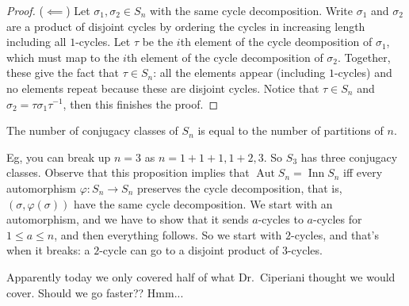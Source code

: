 \begin{example}
\begin{proof}
       ($\impliedby $) Let $\sigma_1,\sigma_2\in S_n$ with the same cycle decomposition. Write $\sigma_1$ and $\sigma_2$ are a product of disjoint cycles by ordering the cycles in increasing length including all $1$-cycles. Let $\tau$ be the $i$th element of the cycle deomposition of $\sigma_1$, which must map to the $i$th element of the cycle decomposition of $\sigma_2$. Together, these give the fact that $\tau\in S_n$: all the elements appear (including $1$-cycles) and no elements repeat because these are disjoint cycles. Notice that $\tau\in S_n$ and $\sigma_2=\tau\sigma_1\tau^{-1}$, then this finishes the proof.
   \end{proof}
   \begin{cor}
       The number of conjugacy classes of $S_n$ is equal to the number of partitions of $n$. 
   \end{cor}
Eg, you can break up $n=3$ as $n=1+1+1, 1+2, 3$. So $S_3$ has three conjugacy classes.
Observe that this proposition implies that $\operatorname{Aut}S_n=\operatorname{Inn}S_n$ iff every automorphism $\varphi \colon S_n \to S_n$ preserves the cycle decomposition, that is, $(\sigma, \varphi (\sigma))$ have the same cycle decomposition. We start with an automorphism, and we have to show that it sends $a$-cycles to $a$-cycles for $1\leq a \leq n$, and then everything follows. So we start with $2$-cycles, and that's when it breaks: a $2$-cycle can go to a disjoint product of $3$-cycles.
\end{example}
Apparently today we only covered half of what Dr.\ Ciperiani thought we would cover. Should we go faster?? Hmm...
